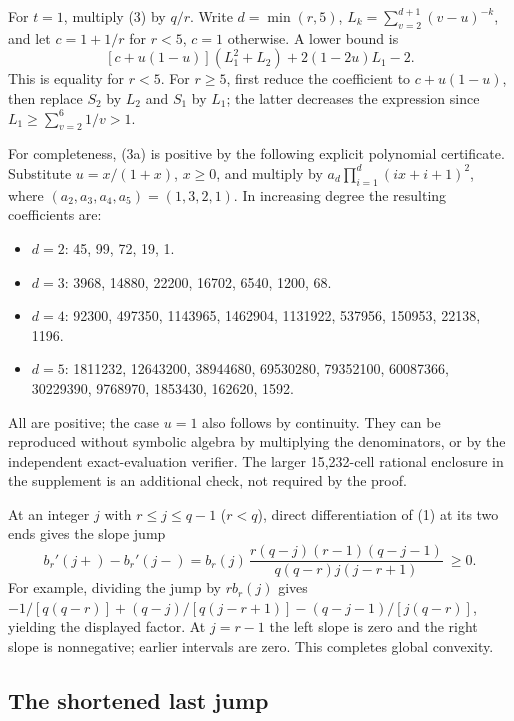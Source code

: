\documentclass[10pt]{article}
\providecommand{\tightlist}{}
\begin{document}
For \(t=1\), multiply (3) by \(q/r\). Write \(d=\min(r,5)\),
\(L_k=\sum_{v=2}^{d+1}(v-u)^{-k}\), and let \(c=1+1/r\) for \(r<5\),
\(c=1\) otherwise. A lower bound is \[
 [c+u(1-u)](L_1^2+L_2)+2(1-2u)L_1-2.                       \tag{3a}
\] This is equality for \(r<5\). For \(r\ge5\), first reduce the
coefficient to \(c+u(1-u)\), then replace \(S_2\) by \(L_2\) and \(S_1\)
by \(L_1\); the latter decreases the expression since
\(L_1\ge\sum_{v=2}^6 1/v>1\).

For completeness, (3a) is positive by the following explicit polynomial
certificate. Substitute \(u=x/(1+x)\), \(x\ge0\), and multiply by
\(a_d\prod_{i=1}^d(ix+i+1)^2\), where \((a_2,a_3,a_4,a_5)=(1,3,2,1)\).
In increasing degree the resulting coefficients are:

\begin{itemize}
\tightlist
\item
  \(d=2\): 45, 99, 72, 19, 1.
\item
  \(d=3\): 3968, 14880, 22200, 16702, 6540, 1200, 68.
\item
  \(d=4\): 92300, 497350, 1143965, 1462904, 1131922, 537956, 150953,
  22138, 1196.
\item
  \(d=5\): 1811232, 12643200, 38944680, 69530280, 79352100, 60087366,
  30229390, 9768970, 1853430, 162620, 1592.
\end{itemize}

All are positive; the case \(u=1\) also follows by continuity. They can
be reproduced without symbolic algebra by multiplying the denominators,
or by the independent exact-evaluation verifier. The larger 15,232-cell
rational enclosure in the supplement is an additional check, not
required by the proof.

At an integer \(j\) with \(r\le j\le q-1\) (\(r<q\)), direct
differentiation of (1) at its two ends gives the slope jump \[
 b_r'(j+)-b_r'(j-)= b_r(j)\,
 \frac{r(q-j)(r-1)(q-j-1)}{q(q-r)j(j-r+1)}\ \ge0.
\] For example, dividing the jump by \(r b_r(j)\) gives
\(-1/[q(q-r)]+(q-j)/[q(j-r+1)]-(q-j-1)/[j(q-r)]\), yielding the
displayed factor. At \(j=r-1\) the left slope is zero and the right
slope is nonnegative; earlier intervals are zero. This completes global
convexity.

\subsection*{The shortened last jump}\label{the-shortened-last-jump}
\end{document}
